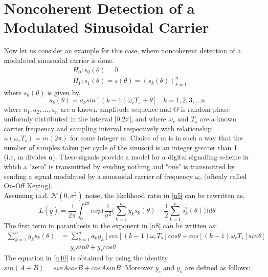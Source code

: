 \documentclass[a4paper,english,12pt]{article}
\begin{document}
\section{ Noncoherent Detection of a Modulated Sinusoidal Carrier}
\par Now let us consider an example for this case, where noncoherent detection of a modulated sinusoidal carrier is done.
\begin{equation*}
      \begin{aligned}
      & H_0 : s_0(\theta)=\underline{0} \\
      & H_1 : s_1(\theta)=\underline{s}(\theta) = (s_k(\theta))_{k=1}^n
      \end{aligned}
\end{equation*}
 where $s_k(\theta)$ is given by,
 \begin{equation*}
     s_k(\theta) = a_k sin[(k-1)\omega_c T_s+\theta]\ \ \ \ k=1,2,3,...n
 \end{equation*}
where $a_1,a_2,...,a_n$ are a known amplitude sequence and $\Theta$ is random phase uniformly distributed in the interval [0,$2\pi$], and where $\omega_c$ and $T_s$ are a known carrier frequency and sampling interval respectively with relationship $n(\omega_cT_s)=m(2\pi)$ for some integer m. Choice of m is in such a way that the number of samples taken per cycle of the sinusoid is an integer greater than 1 (i.e, m divides n). These signals provide a model for a digital signalling scheme in which a "zero" is transmitted by sending nothing and "one" is transmitted by sending a signal modulated by a sinusoidal carrier of frequency $\omega_c$ (oftenly called On-Off Keying). \\
Assuming i.i.d. $\mathcal{N}(0,\sigma^2)$ noise, the likelihood ratio in \eqref{n5} can be rewritten as,
\begin{equation}
 \label{n8}
 L(\underline{y})=\frac{1}{2\pi}\int_{0}^{2\pi} exp\bigg(\frac{1}{\sigma^2}\big(\sum_{k=1}^{n}y_k s_k(\theta)-\frac{1}{2}\sum_{k=1}^{n}s_k^2(\theta)\big)
\bigg)d\theta
\end{equation}
The first term in paranthesis in the exponent in \eqref{n8} can be written as:
\begin{align}
\sum_{k=1}^{n}y_k s_k(\theta) &= \sum_{k=1}^{n} a_k y_k[sin[(k-1)\omega_c T_s] cos\theta+cos[(k-1)\omega_c T_s] sin\theta] \\
 \label{n10}
&= y_c sin\theta +y_s cos\theta
\end{align}
The equation in \eqref{n10} is obtained by using the identity $sin(A+B)=sinAcosB+cosAsinB$. Moreover $y_c$ and $y_s$ are defined as follows:
\end{document}

